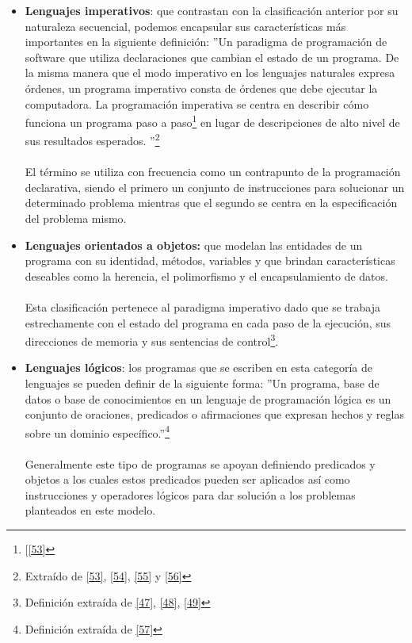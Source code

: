 \begin{itemize}
        \item  \textbf{Lenguajes imperativos}: que contrastan con la clasificación anterior por su naturaleza secuencial, podemos encapsular sus características más importantes en la siguiente definición: 
         ''Un paradigma de programación de software que utiliza declaraciones que cambian el estado de un programa. De la misma manera que el modo imperativo en los lenguajes naturales expresa órdenes, un programa imperativo consta de órdenes que debe ejecutar la computadora. La programación imperativa se centra en describir cómo funciona un programa paso a paso\footnote{[\hyperlink{53}{[53]}} en lugar de descripciones de alto nivel de sus resultados esperados. ''\footnote{Extraído de \hyperlink{53}{[53]}, \hyperlink{54}{[54]}, \hyperlink{55}{[55]} y \hyperlink{56}{[56]}}\\\\
        El término se utiliza con frecuencia como un contrapunto de la programación declarativa, siendo el primero un conjunto de instrucciones para solucionar un determinado problema mientras que el segundo se centra en la especificación del problema mismo.\\

        \item \textbf{Lenguajes orientados a objetos:} que modelan las entidades de un programa con su identidad, métodos, variables y que brindan características deseables como la herencia, el polimorfismo y el encapsulamiento de datos.\\\\
        Esta clasificación pertenece al paradigma imperativo dado que se trabaja estrechamente con el estado del programa en cada paso de la ejecución, sus direcciones de memoria y sus sentencias de control\footnote{Definición extraída de \hyperlink{47}{[47]}, \hyperlink{48}{[48]}, \hyperlink{49}{[49]}}.\\
    
        \item \textbf{Lenguajes lógicos}: los programas que se escriben en esta categoría de lenguajes se pueden definir de la siguiente forma:  ''Un programa, base de datos o base de conocimientos en un lenguaje de programación lógica es un conjunto de oraciones, predicados o afirmaciones que expresan hechos y reglas sobre un dominio específico.''\footnote{Definición extraída de \hyperlink{57}{[57]}} \\\\
        Generalmente este tipo de programas se apoyan definiendo predicados y objetos a los cuales estos predicados pueden ser aplicados así como instrucciones y operadores lógicos para dar solución a los problemas planteados en este modelo.

    
    \end{itemize}

